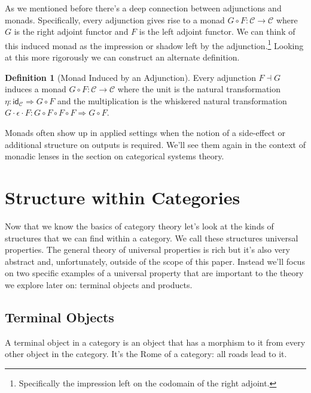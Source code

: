 \documentclass[12pt]{article}
\theoremstyle{definition}
\newtheorem{definition}{Definition}
\begin{document}
As we mentioned before there's a deep connection between adjunctions and monads.
Specifically, every adjunction gives rise to a monad $G \circ F: \mathcal{C} \rightarrow \mathcal{C}$ where $G$ is the right adjoint functor and $F$ is the left adjoint functor.
We can think of this induced monad as the impression or shadow left by the adjunction.\footnote{Specifically the impression left on the codomain of the right adjoint.}
Looking at this more rigorously we can construct an alternate definition.
\begin{definition}[Monad Induced by an Adjunction]
    Every adjunction $F \dashv G$ induces a monad $G \circ F: \mathcal{C} \rightarrow \mathcal{C}$ where the unit is the natural transformation $\eta : \mathsf{id}_\mathcal{C} \Rightarrow G \circ F$ and the multiplication is the whiskered natural transformation $G \cdot \epsilon \cdot F: G \circ F \circ F \circ F \Rightarrow G \circ F$.
\end{definition}

Monads often show up in applied settings when the notion of a side-effect or additional structure on outputs is required.
We'll see them again in the context of monadic lenses in the section on categorical systems theory.











\pagebreak
\section*{Structure within Categories}

Now that we know the basics of category theory let's look at the kinds of structures that we can find within a category.
We call these structures universal properties.
The general theory of universal properties is rich but it's also very abstract and, unfortunately, outside of the scope of this paper.
Instead we'll focus on two specific examples of a universal property that are important to the theory we explore later on: terminal objects and products.

\subsection*{Terminal Objects}
A terminal object in a category is an object that has a morphism to it from every other object in the category.
It's the Rome of a category: all roads lead to it.
\end{document}
